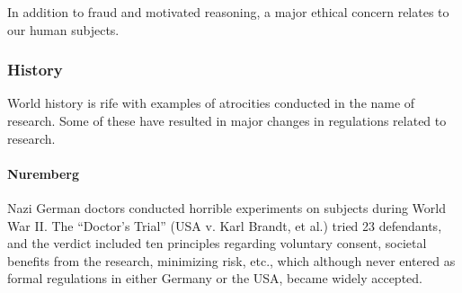 \documentclass[12pt] {article}
\begin{document}
In addition to fraud and motivated reasoning, a major ethical concern relates to our human
subjects.

\subsubsection{History}\label{history}

World history is rife with examples of atrocities conducted in the name
of research. Some of these have resulted in major changes in regulations
related to research.

\paragraph{Nuremberg}\label{nuremberg}

Nazi German doctors conducted horrible experiments on subjects during
World War II. The ``Doctor's Trial'' (USA v. Karl Brandt, et al.) tried
23 defendants, and the verdict included ten principles regarding voluntary consent, societal benefits from the research, minimizing risk, etc.,
which although never entered as formal regulations in either Germany or
the USA, became widely accepted.


\end{document}
